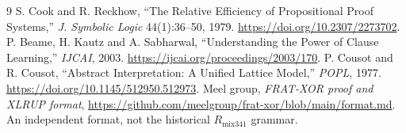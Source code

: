 \documentclass[11pt]{article}
\begin{document}
\begin{thebibliography}{9}
 S. Cook and R. Reckhow, ``The Relative Efficiency of Propositional Proof Systems,'' \emph{J. Symbolic Logic} 44(1):36--50, 1979. \url{https://doi.org/10.2307/2273702}.
 P. Beame, H. Kautz and A. Sabharwal, ``Understanding the Power of Clause Learning,'' \emph{IJCAI}, 2003. \url{https://ijcai.org/proceedings/2003/170}.
 P. Cousot and R. Cousot, ``Abstract Interpretation: A Unified Lattice Model,'' \emph{POPL}, 1977. \url{https://doi.org/10.1145/512950.512973}.
 Meel group, \emph{FRAT-XOR proof and XLRUP format}, \url{https://github.com/meelgroup/frat-xor/blob/main/format.md}. An independent format, not the historical $R_{\mathrm{mix341}}$ grammar.
\end{thebibliography}
\end{document}
